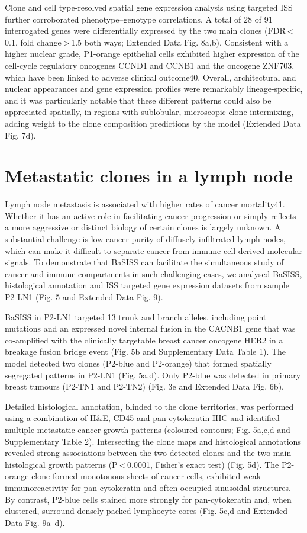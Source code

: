 Clone and cell type-resolved spatial gene expression analysis using targeted ISS further corroborated phenotype–genotype correlations. A total of 28 of 91 interrogated genes were differentially expressed by the two main clones (FDR < 0.1, fold change > 1.5 both ways; Extended Data Fig. 8a,b). Consistent with a higher nuclear grade, P1-orange epithelial cells exhibited higher expression of the cell-cycle regulatory oncogenes CCND1 and CCNB1 and the oncogene ZNF703, which have been linked to adverse clinical outcome40. Overall, architectural and nuclear appearances and gene expression profiles were remarkably lineage-specific, and it was particularly notable that these different patterns could also be appreciated spatially, in regions with sublobular, microscopic clone intermixing, adding weight to the clone composition predictions by the model (Extended Data Fig. 7d).

\section{Metastatic clones in a lymph node}

Lymph node metastasis is associated with higher rates of cancer mortality41. Whether it has an active role in facilitating cancer progression or simply reflects a more aggressive or distinct biology of certain clones is largely unknown. A substantial challenge is low cancer purity of diffusely infiltrated lymph nodes, which can make it difficult to separate cancer from immune cell-derived molecular signals. To demonstrate that BaSISS can facilitate the simultaneous study of cancer and immune compartments in such challenging cases, we analysed BaSISS, histological annotation and ISS targeted gene expression datasets from sample P2-LN1 (Fig. 5 and Extended Data Fig. 9).

BaSISS in P2-LN1 targeted 13 trunk and branch alleles, including point mutations and an expressed novel internal fusion in the CACNB1 gene that was co-amplified with the clinically targetable breast cancer oncogene HER2 in a breakage fusion bridge event (Fig. 5b and Supplementary Data Table 1). The model detected two clones (P2-blue and P2-orange) that formed spatially segregated patterns in P2-LN1 (Fig. 5a,d). Only P2-blue was detected in primary breast tumours (P2-TN1 and P2-TN2) (Fig. 3e and Extended Data Fig. 6b).

Detailed histological annotation, blinded to the clone territories, was performed using a combination of H\&E, CD45 and pan-cytokeratin IHC and identified multiple metastatic cancer growth patterns (coloured contours; Fig. 5a,c,d and Supplementary Table 2). Intersecting the clone maps and histological annotations revealed strong associations between the two detected clones and the two main histological growth patterns (P < 0.0001, Fisher’s exact test) (Fig. 5d). The P2-orange clone formed monotonous sheets of cancer cells, exhibited weak immunoreactivity for pan-cytokeratin and often occupied sinusoidal structures. By contrast, P2-blue cells stained more strongly for pan-cytokeratin and, when clustered, surround densely packed lymphocyte cores (Fig. 5c,d and Extended Data Fig. 9a–d).

